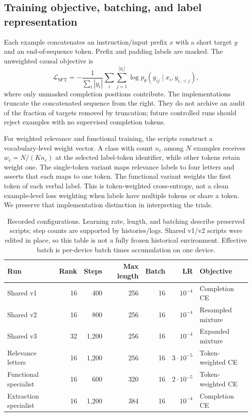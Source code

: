 \subsection{Training objective, batching, and label representation}
Each example concatenates an instruction/input prefix $x$ with a short target $y$ and an end-of-sequence token. Prefix and padding labels are masked. The unweighted causal objective is
\begin{equation}
\mathcal{L}_{\mathrm{SFT}}
 =-\frac{1}{\sum_i |y_i|}\sum_i\sum_{j=1}^{|y_i|}
 \log p_{\theta}(y_{ij}\mid x_i,y_{i,<j}),
\label{eq:sft}
\end{equation}
where only unmasked completion positions contribute. The implementations truncate the concatenated sequence from the right. They do not archive an audit of the fraction of targets removed by truncation; future controlled runs should reject examples with no supervised completion tokens.

For weighted relevance and functional training, the scripts construct a vocabulary-level weight vector. A class with count $n_c$ among $N$ examples receives $w_c=N/(K n_c)$ at the selected label-token identifier, while other tokens retain weight one. The single-token variant maps relevance labels to four letters and asserts that each maps to one token. The functional variant weights the first token of each verbal label. This is token-weighted cross-entropy, not a clean example-level loss weighting when labels have multiple tokens or share a token. We preserve that implementation distinction in interpreting the trials.

\begin{table}[t]
\centering\small
\caption{Recorded configurations. Learning rate, length, and batching describe preserved scripts; step counts are supported by histories/logs. Shared v1/v2 scripts were edited in place, so this table is not a fully frozen historical environment. Effective batch is per-device batch times accumulation on one device.}
\label{tab:config}
\begin{tabular}{lrrrrrl}
\toprule
Run & Rank & Steps & Max length & Batch & LR & Objective \\
\midrule
Shared v1 & 16 & 400 & 256 & 16 & $10^{-4}$ & Completion CE \\
Shared v2 & 16 & 800 & 256 & 16 & $10^{-4}$ & Resampled mixture \\
Shared v3 & 32 & 1,200 & 256 & 16 & $10^{-4}$ & Expanded mixture \\
Relevance letters & 16 & 1,200 & 256 & 16 & $3\cdot10^{-5}$ & Token-weighted CE \\
Functional specialist & 16 & 600 & 320 & 16 & $2\cdot10^{-5}$ & Token-weighted CE \\
Extraction specialist & 16 & 1,200 & 384 & 16 & $10^{-4}$ & Completion CE \\
\bottomrule
\end{tabular}
\end{table}

